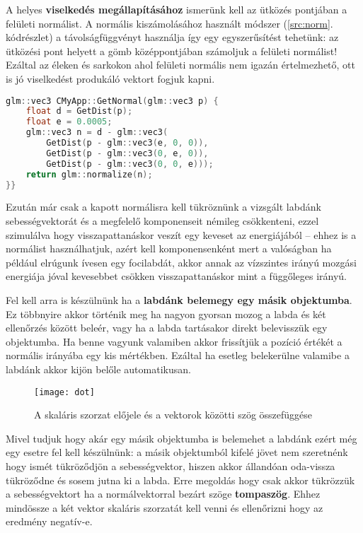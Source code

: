 A helyes \textbf{viselkedés megállapításához} ismerünk kell az ütközés pontjában a felületi normálist. A normális kiszámolásához használt módszer (\ref{src:norm}. kódrészlet) a távolságfüggvényt használja így egy egyszerűsítést tehetünk: az ütközési pont helyett a gömb középpontjában számoljuk a felületi normálist! Ezáltal az éleken és sarkokon ahol felületi normális nem igazán értelmezhető, ott is jó viselkedést produkáló vektort fogjuk kapni.

\begin{lstlisting}[language={C++}]
glm::vec3 CMyApp::GetNormal(glm::vec3 p) {
	float d = GetDist(p);
	float e = 0.0005;
	glm::vec3 n = d - glm::vec3(
		GetDist(p - glm::vec3(e, 0, 0)),
		GetDist(p - glm::vec3(0, e, 0)),
		GetDist(p - glm::vec3(0, 0, e)));
	return glm::normalize(n);
}}
\end{lstlisting}

Ezután már csak a kapott normálisra kell tükröznünk a vizsgált labdánk sebességvektorát és a megfelelő komponenseit némileg csökkenteni, ezzel szimulálva hogy visszapattanáskor veszít egy keveset az energiájából -- ehhez is a normálist használhatjuk, azért kell komponensenként mert a valóságban ha például elrúgunk ívesen egy focilabdát, akkor annak az vízszintes irányú mozgási energiája jóval kevesebbet csökken visszapattanáskor mint a függőleges irányú. 

Fel kell arra is készülnünk ha a \textbf{labdánk belemegy egy másik objektumba}. Ez többnyire akkor történik meg ha nagyon gyorsan mozog a labda és két ellenőrzés között beleér, vagy ha a labda tartásakor direkt belevisszük egy objektumba. Ha benne vagyunk valamiben akkor frissítjük a pozíció értékét a normális irányába egy kis mértékben. Ezáltal ha esetleg belekerülne valamibe a labdánk akkor kijön belőle automatikusan.

\begin{figure}[H]
	\centering
	\texttt{[image: dot]}
	\caption{A skaláris szorzat előjele és a vektorok közötti szög összefüggése \cite{13DotPro51:online}}
	\label{fig:dot}
\end{figure}

Mivel tudjuk hogy akár egy másik objektumba is belemehet a labdánk ezért még egy esetre fel kell készülnünk: a másik objektumból kifelé jövet nem szeretnénk hogy ismét tükröződjön a sebességvektor, hiszen akkor állandóan oda-vissza tükröződne és sosem jutna ki a labda. Erre megoldás hogy csak akkor tükrözzük a sebességvektort ha a normálvektorral bezárt szöge \textbf{tompaszög}. Ehhez mindössze a két vektor skaláris szorzatát kell venni és ellenőrizni hogy az eredmény negatív-e.

